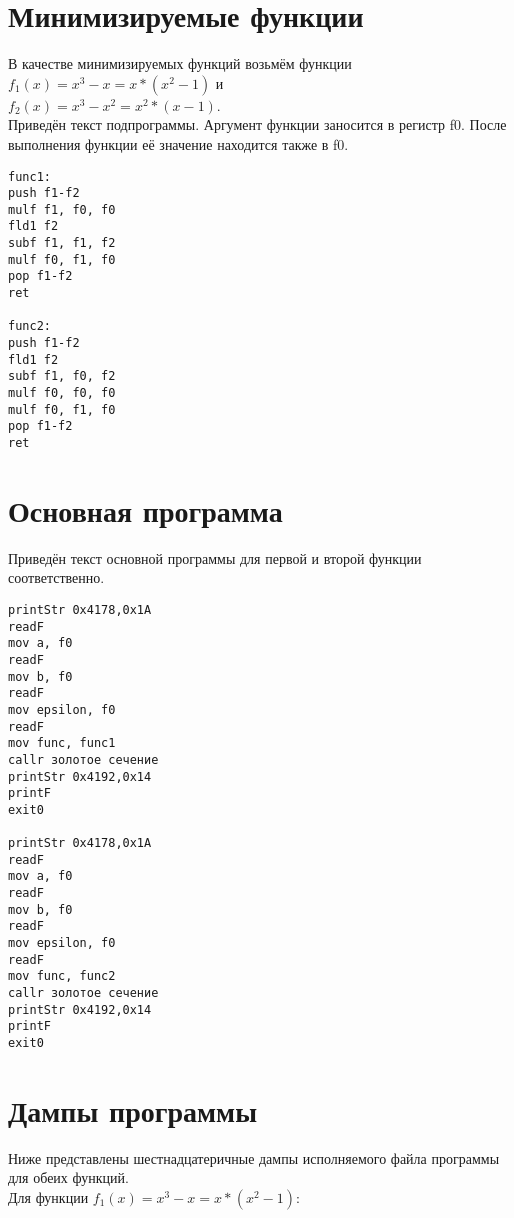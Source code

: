 \documentclass[12pt,a4paper,oneside]{report}
\begin{document}
\section{Минимизируемые функции}
В качестве минимизируемых функций возьмём функции $f_1(x)=x^3-x=x*(x^2-1)$ и \\
$f_2(x)=x^3-x^2=x^2*(x-1)$. 
\\Приведён текст подпрограммы. Аргумент функции заносится в регистр f0. После выполнения функции её значение находится также в f0.
\begin{multicols}{2}
\begin{verbatim}
func1:
push f1-f2
mulf f1, f0, f0 
fld1 f2
subf f1, f1, f2
mulf f0, f1, f0
pop f1-f2
ret

func2:
push f1-f2
fld1 f2
subf f1, f0, f2
mulf f0, f0, f0
mulf f0, f1, f0
pop f1-f2
ret
\end{verbatim}
\end{multicols}

\section{Основная программа}
Приведён текст основной программы для первой и второй функции соответственно.
\begin{verbatim}
printStr 0x4178,0x1A
readF
mov a, f0
readF
mov b, f0
readF
mov epsilon, f0
readF
mov func, func1
callr золотое сечение
printStr 0x4192,0x14
printF
exit0

printStr 0x4178,0x1A
readF
mov a, f0
readF
mov b, f0
readF
mov epsilon, f0
readF
mov func, func2
callr золотое сечение
printStr 0x4192,0x14
printF
exit0
\end{verbatim}

\section{Дампы программы}
Ниже представлены шестнадцатеричные дампы исполняемого файла программы для обеих функций.
\\Для функции $f_1(x)=x^3-x=x*(x^2-1)$:
\end{document}
